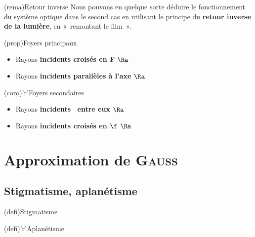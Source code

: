\documentclass[../../main/main.tex]{subfiles}
\begin{document}
\begin{tcb}[label=rema:retinv](rema){Retour inverse}
	Nous pouvons en quelque sorte déduire le fonctionnement du système
	optique dans le second cas en utilisant le principe du \textbf{retour
		inverse de la lumière}, en «~remontant le film~».
\end{tcb}
\begin{tcbraster}[raster multicolumn=2]
	\begin{tcb}[label=prop:foy](prop){Foyers principaux}
		\begin{itemize}[label=$\diamond$, leftmargin=10pt]
			\item Rayons \textbf{incidents croisés en F} $\Ra$ 
			\item Rayons \textbf{incidents parallèles à l'axe} $\Ra$ 
		\end{itemize}
	\end{tcb}
	\begin{tcb}[label=coro:foysec](coro)'r'{Foyers secondaires}
		\begin{itemize}[label=$\diamond$, leftmargin=10pt]
			\item Rayons \textbf{incidents \parr\ entre eux} $\Ra$ 
			\item Rayons \textbf{incidents croisés en $\f$} $\Ra$ 
		\end{itemize}
	\end{tcb}
\end{tcbraster}

\section{Approximation de \textsc{Gauss}}

\subsection{Stigmatisme, aplanétisme}

\begin{tcbraster}[raster columns=2, raster equal height=rows]
	\begin{tcb}[label=def:stig](defi){Stigmatisme}
	\end{tcb}
	\begin{tcb}[label=def:apla](defi)'r'{Aplanétisme}
	\end{tcb}
\end{tcbraster}
\end{document}

